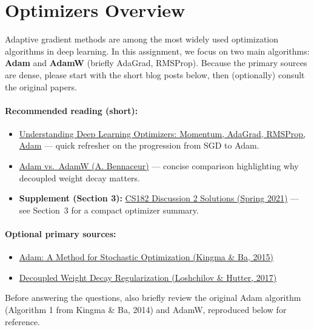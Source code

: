 \documentclass[11pt]{article}
\begin{document}
\newpage
\section*{Optimizers Overview}
Adaptive gradient methods are among the most widely used optimization algorithms in deep learning. In this assignment, we focus on two main algorithms: \textbf{Adam} and \textbf{AdamW} (briefly AdaGrad, RMSProp). Because the primary sources are dense, please start with the short blog posts below, then (optionally) consult the original papers.

\paragraph*{Recommended reading (short):}
\begin{itemize}[leftmargin=1.4em]
    \item \href{https://towardsdatascience.com/understanding-deep-learning-optimizers-momentum-adagrad-rmsprop-adam-e311e377e9c2/}{Understanding Deep Learning Optimizers: Momentum, AdaGrad, RMSProp, Adam} — quick refresher on the progression from SGD to Adam.
  \item \href{https://adelbennaceur.github.io/posts/adam_vs_adamw/}{Adam vs.\ AdamW (A. Bennaceur)} — concise comparison highlighting why decoupled weight decay matters.
  \item \textbf{Supplement (Section 3):} \href{https://cs182sp21.github.io/static/discussions/dis2-sol.pdf}{CS182 Discussion 2 Solutions (Spring 2021)} — see Section~3 for a compact optimizer summary.
\end{itemize}

\paragraph*{Optional primary sources:}
\begin{itemize}[leftmargin=1.4em]
  \item \href{https://arxiv.org/abs/1412.6980}{Adam: A Method for Stochastic Optimization (Kingma \& Ba, 2015)}
  \item \href{https://arxiv.org/abs/1711.05101}{Decoupled Weight Decay Regularization (Loshchilov \& Hutter, 2017)}
\end{itemize}

Before answering the questions, also briefly review the original Adam algorithm (Algorithm 1 from Kingma \& Ba, 2014) and AdamW, reproduced below for reference.
\end{document}
